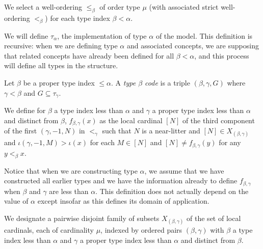 \begin{definition}
\label {def:typewords}
We select a well-ordering $\leq_\beta$ of order type $\mu$ (with associated strict well-ordering $<_\beta$) for each type index $\beta<\alpha$.
\end{definition}

We will define $\tau_\alpha$, the implementation of type $\alpha$ of the model.  This definition is recursive:  when we are defining type $\alpha$ and associated concepts, we are supposing that related concepts have already been defined for all $\beta<\alpha$, and this process will define all types in the structure.

\begin{definition}
\label {def:code}
Let $\beta$ be a proper type index $\leq \alpha$.
A {\em type $\beta$ code} is a triple $(\beta,\gamma,G)$ where $\gamma<\beta$ and $G \subseteq \tau_\gamma$.
\end{definition}





\begin{definition}
\label {def:fmap}
We define for $\beta$ a type index less than $\alpha$ and $\gamma$ a proper type index less than $\alpha$ and distinct from $\beta$, $f_{\beta,\gamma}(x)$ as the local cardinal $[N]$ of the third component of the first $(\gamma,-1,N)$ in $<_\gamma$ such that $N$ is a near-litter and $[N] \in X_{(\beta,\gamma)}$ and $\iota(\gamma,-1,M)>\iota(x)$ for each $M \in [N]$ and $[N] \neq f_{\beta,\gamma}(y)$ for any $y <_\beta x$.
\end{definition}

Notice that when we are constructing type $\alpha$, we assume that we have constructed all earlier types and we have the information already to define $f_{\beta,\gamma}$ when $\beta$ and $\gamma$ are less than $\alpha$.  This definition does not actually depend on the value of $\alpha$ except insofar as this defines its domain of application.

\begin{definition}
\label {def:ftargets}
We designate a pairwise disjoint family of subsets $X_{(\beta,\gamma)}$ of the set of local cardinals, each of cardinality $\mu$, indexed by ordered pairs $(\beta,\gamma)$ with $\beta$ a type index less than $\alpha$ and $\gamma$ a proper type index less than $\alpha$ and distinct from $\beta$.
\end{definition}

